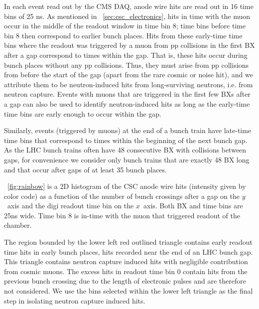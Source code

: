 
In each event read out by the CMS DAQ, anode wire hits are read out in 16 time bins of 25 ns. As mentioned in \Sec~\ref{sec:csc_electronics}, hits in time with the muon occur in the middle of the readout window in time bin 8; time bins before time bin 8 then correspond to earlier bunch places. Hits from these early-time time bins where the readout was triggered by a muon from pp collisions in the first BX after a gap correspond to times within the gap. That is, these hits occur during bunch places without any pp collisions. Thus, they must arise from pp collisions from before the start of the gap (apart from the rare cosmic or noise hit), and we attribute them to be neutron-induced hits from long-surviving neutrons, i.e. from neutron capture. Events with muons that are triggered in the first few BXs after a gap can also be used to identify neutron-induced hits as long as the early-time time bins are early enough to occur within the gap. 

Similarly, events (triggered by muons) at the end of a bunch train have late-time time bins that correspond to times within the beginning of the next bunch gap. As the LHC bunch trains often have 48 consecutive BX with collisions between gaps, for convenience we consider only bunch trains that are exactly 48 BX long and that occur after gaps of at least 35 bunch places. 

\Fig~\ref{fig:rainbow} is a 2D histogram of the CSC anode wire hits (intensity given by color code) as a function of the number of bunch crossings after a gap on the $y$~axis and the digi readout time bin on the $x$~axis. Both BX and time bins are 25\unit{ns} wide. Time bin 8 is in-time with the muon that triggered readout of the chamber.


The region bounded by the lower left red outlined triangle contains early readout time hits in early bunch places, \ie hits recorded near the end of an LHC bunch gap. This triangle contains neutron capture induced hits with negligible contribution from cosmic muons. The excess hits in readout time bin 0 contain hits from the previous bunch crossing due to the length of electronic pulses and are therefore not considered. We use the bins selected within the lower left triangle as the final step in isolating neutron capture induced hits. 

